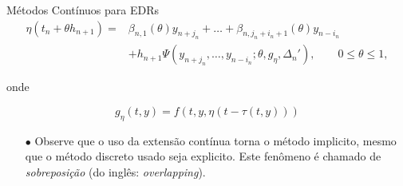 \documentclass{beamer}
\theoremstyle{plain}
\theoremstyle{definition}
\begin{document}
\begin{frame}{Métodos Contínuos para EDRs}
    \begin{equation}
        \begin{split}
            \eta(t_n + \theta h_{n+1}) = &\beta_{n, 1} (\theta) y_{n + j_n} + \dots + \beta_{n, j_n + i_n + 1}(\theta) y_{n - i_n} \\
                                         &+ h_{n+1} \Psi(y_{n+j_n}, \dots, y_{n-i_n}; \theta, g_\eta, \Delta _n '), \qquad 0 \leq \theta \leq 1,
                                         \label{chap3:sec:2:def:eq:Interpolant_extension}
        \end{split}
    \end{equation}


    onde

    $$
    g_{\eta}(t, y)=f(t, y, \eta(t-\tau(t, y)))
    $$

    \begin{itemize}
        \item[$\bullet$] Observe que o uso da extensão contínua torna o método implicito, mesmo que o método discreto usado seja explicito. Este fenômeno é chamado de \textit{sobreposição} (do inglês: \textit{overlapping}).

    \end{itemize}

\end{frame}


\end{document}
